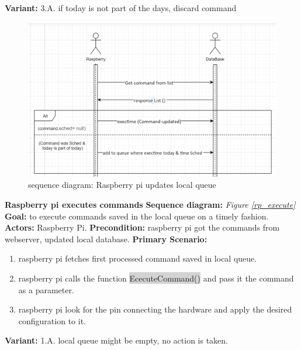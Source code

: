 \documentclass[12pt, oneside, a4paper]{book}
\newcommand{\code}[1]{{\color{red}\colorbox{lightgray}{#1}}}
\newcommand\boldcolor[1]{\textcolor{bold}{\textbf{#1}}}
\begin{document}
				\textbf{Variant:}\newline
				\hspace*{5mm}3.A. if today is not part of the days, discard command \\
				\begin{figure}[H]
					\includegraphics[width=\linewidth]{img/sequence_queue.png}
					\caption{sequence diagram: Raspberry pi updates local queue}					\label{rp_queue}
				\end{figure}
				\newpage\hspace*{-6mm}\boldcolor{Raspberry pi executes commands}
				\newline\textbf{Sequence diagram:} \textit{Figure \ref{rp_execute}}
				\newline\textbf{Goal:} to execute commands saved in the local queue on a timely fashion.
				\newline\textbf{Actors:} Raspberry Pi.	
				\newline\textbf{Precondition:} raspberry pi got the commands from webserver, updated local database.
				\newline\textbf{Primary Scenario:}	
				\begin{enumerate}[label*=\arabic*.]
					\item raspberry pi fetches first processed command saved in local queue.
					\item raspberry pi calls the function \code{EcecuteCommand()} and pass it the command as a parameter.
					\item raspberry pi look for the pin connecting the hardware and apply the desired configuration to it.
				\end{enumerate}
				\textbf{Variant:}\newline	
				\hspace*{5mm}1.A. local queue might be empty, no action is taken. \\
\end{document}
